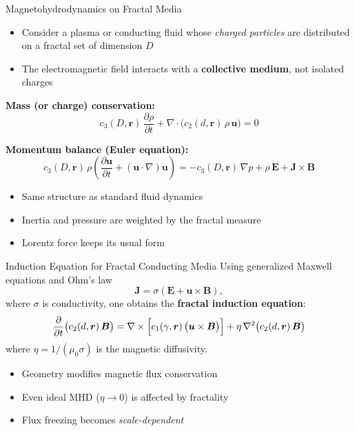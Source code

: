 \documentclass[11pt]{beamer}
\begin{document}
\begin{frame}{Magnetohydrodynamics on Fractal Media}
\begin{itemize}
  \item Consider a plasma or conducting fluid whose \emph{charged particles}
        are distributed on a fractal set of dimension $D$
  \item The electromagnetic field interacts with a \textbf{collective medium},
        not isolated charges
\end{itemize}

\textbf{Mass (or charge) conservation:}
\begin{equation*}
  c_3(D,\bm r)\, \frac{\partial \rho}{\partial t}
  + \nabla \cdot \bigl( c_2(d,\bm r)\, \rho\, \bm u \bigr) = 0
\end{equation*}

\vspace{0.2cm}
\textbf{Momentum balance (Euler equation):}
\begin{equation*}
  c_3(D,\bm r)\, \rho
  \left(
    \frac{\partial \bm u}{\partial t}
    + (\bm u \cdot \nabla)\bm u
  \right)
  = - c_3(D,\bm r)\, \nabla p
    + \rho\, \bm E
    + \bm J \times \bm B
\end{equation*}

\begin{itemize}
  \item Same structure as standard fluid dynamics
  \item Inertia and pressure are weighted by the fractal measure
  \item Lorentz force keeps its usual form
\end{itemize}
\end{frame}


\begin{frame}{Induction Equation for Fractal Conducting Media}
Using generalized Maxwell equations and Ohm's law
\[
  \bm J = \sigma \left( \bm E + \bm u \times \bm B \right),
\]
where $\sigma$ is conductivity, one obtains the \textbf{fractal induction equation}:
\begin{equation*}
  \frac{\partial}{\partial t}
  \bigl( c_2(d,\bm r)\, \bm B \bigr)
  = \nabla \times
  \Bigl[
    c_1(\gamma,\bm r)\,
    \bigl( \bm u \times \bm B \bigr)
  \Bigr]
  +
  \eta\, \nabla^2
  \bigl( c_2(d,\bm r)\, \bm B \bigr)
\end{equation*}
where $\eta = 1/(\mu_0 \sigma)$ is the magnetic diffusivity.

\begin{itemize}
  \item Geometry modifies magnetic flux conservation
  \item Even ideal MHD ($\eta \to 0$) is affected by fractality
  \item Flux freezing becomes \emph{scale-dependent}
\end{itemize}
\end{frame}
\end{document}
